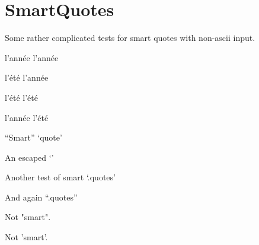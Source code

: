 
\def\mytitle{SmartQuotes Test}


\part{SmartQuotes}
\label{smartquotes}

Some rather complicated tests for smart quotes with non-ascii input.

l'année l'année

l'été l'année

l'été l'été

l'année l'été

``Smart'' `quote'

An escaped `\textbar{}'

Another test of smart `.quotes'

And again ``.quotes''

Not "smart".

Not 'smart'.




